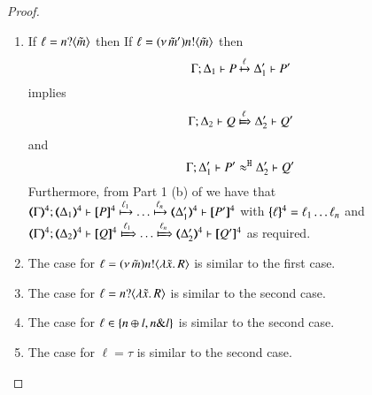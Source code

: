 \begin{proof}
\begin{enumerate}
		\item	If $\ell = n ? \langle \tilde{m} \rangle$ then
				If $\ell = (\nu\, \tilde{m}') n ! \langle \tilde{m} \rangle$ then
				\[
				\Gamma; \Delta_1 \vdash P \xmapsto{\ell} \Delta_1' \vdash P'
				\]
				implies
				\[
				\horel{\Gamma}{\Delta_2}{Q}{\Hby{\ell}}{\Delta_2'}{Q'}
				\]
				and
				\[
				\Gamma; \Delta_1' \vdash P' \approx^\mathtt{H} \Delta_2' \vdash Q'
				\]
				Furthermore, from Part 1 (b) of  we have that
				$\horel{\tmap{\Gamma}{4}}{\tmap{\Delta_1}{4}}{\pmap{P}{4}}{\hby{\ell_1} \dots \hby{\ell_n}}{\tmap{\Delta_1'}{4}}{\pmap{P'}{4}}$
				with $\{\!\!\{\ell\}\!\!\}^{4} = \ell_1 \dots \ell_n$
				and
				$\horel{\tmap{\Gamma}{4}}{\tmap{\Delta_2}{4}}{\pmap{Q}{4}}{\Hby{\ell_1} \dots \Hby{\ell_n}}{\tmap{\Delta_2'}{4}}{\pmap{Q'}{4}}$
				as required.
		\item	The case for $\ell = (\nu\, \tilde{m}) n ! \langle \lambda \tilde{x}.\,R \rangle$
		is similar to the first case.
		
		\item	The case for $\ell = n ? \langle \lambda \tilde{x}.\,R \rangle$
		is similar to the second case.
		
		\item	The case for $\ell \in \{n \oplus l, n \& l\}$ is similar to the second case.
		
		\item	The case for $\ell = \tau$ is similar to the second case.
		
	\end{enumerate}
\end{proof}

